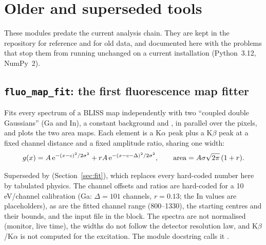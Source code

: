 \section{Older and superseded tools}\label{sec:legacy}

These modules predate the current analysis chain. They are kept in the repository for
reference and for old data, and documented here with the problems that stop them from running
unchanged on a current installation (Python~3.12, NumPy~2).

\subsection{\texttt{fluo\_map\_fit}: the first fluorescence map fitter}

Fits every spectrum of a BLISS map independently with two ``coupled double Gaussians'' (Ga
and In), a constant background and , in parallel over the pixels, and plots the
two area maps. Each element is a K$\alpha$ peak plus a K$\beta$ peak at a fixed channel
distance and a fixed amplitude ratio, sharing one width:
\begin{equation}
  g(x) = A\,\mathrm{e}^{-(x-c)^2/2\sigma^2} + rA\,\mathrm{e}^{-(x-c-\Delta)^2/2\sigma^2},
  \qquad \text{area} = A\sigma\sqrt{2\pi}\,(1+r).
\end{equation}

\begin{issue}
Superseded by  (Section~\ref{sec:fit}), which replaces every hard-coded number
here by tabulated physics. The channel offsets and ratios are hard-coded for a 10\,eV/channel
calibration (Ga: $\Delta = 101$ channels, $r = 0.13$; the In values are placeholders), as are
the fitted channel range (800--1330), the starting centres and their bounds, and the input
file in the  block. The spectra are not normalised (monitor, live time), the
widths do not follow the detector resolution law, and K$\beta$/K$\alpha$ is not computed for
the excitation. The module docstring calls it .
\end{issue}


